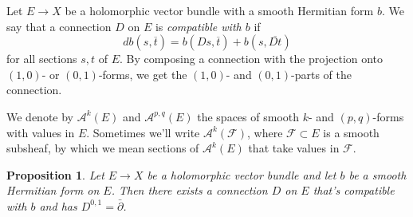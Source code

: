 \documentclass[10pt,a4paper]{amsart}
\newtheorem{prop}[theo]{Proposition}
\theoremstyle{definition}
\newcommand{\cc}[1]{\mathcal{#1}}
\def\ov#1{\overline{#1}}
\begin{document}
Let $E \to X$ be a holomorphic vector bundle with a smooth Hermitian form $b$. We say that a connection $D$ on $E$ is \emph{compatible with $b$} if
\[
d b(s, \ov t) = b(Ds, \ov t) + b(s, \ov{Dt})
\]
for all sections $s, t$ of $E$. By composing a connection with the projection onto $(1,0)$- or $(0,1)$-forms, we get the $(1,0)$- and $(0,1)$-parts of the connection.

We denote by $\cc A^k(E)$ and $\cc A^{p,q}(E)$ the spaces of smooth $k$- and $(p,q)$-forms with values in $E$.
Sometimes we'll write $\cc A^k(\cc F)$, where $\cc F \subset E$ is a smooth subsheaf, by which we mean sections of $\cc A^k(E)$ that take values in $\cc F$.


\begin{prop}
Let $E \to X$ be a holomorphic vector bundle and let $b$ be a smooth Hermitian form on $E$. Then there exists a connection $D$ on $E$ that's compatible with $b$ and has $D^{0,1} = \bar\partial$.
\end{prop}
\end{document}
